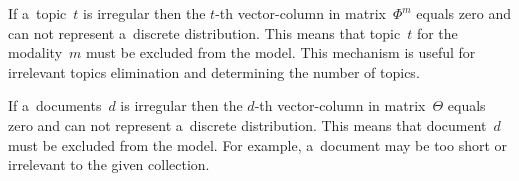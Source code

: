 \documentclass[russian]{llncs}
\begin{document}
\begin{note}
    If a~topic~$t$ is irregular
    then the $t$-th vector-column in matrix~$\Phi^m$ equals zero
    and can not represent a~discrete distribution.
    This means that topic~$t$ for the modality~$m$ must be excluded from the model.
    This mechanism is useful for irrelevant topics elimination and determining the number of topics.
\end{note}
\begin{note}
    If a~documents~$d$ is irregular
    then the $d$-th vector-column in matrix~$\Theta$ equals zero
    and can not represent a~discrete distribution.
    This means that document~$d$ must be excluded from the model.
    For example, a~document may be too short or irrelevant to the given collection.
\end{note}
\end{document}
